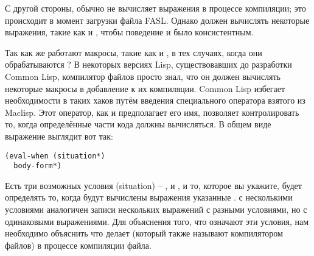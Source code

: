 С другой стороны,  обычно не вычисляет выражения в процессе компиляции;
это происходит в момент загрузки файла FASL. Однако  должен вычислять
некоторые выражения, такие как  и , чтобы поведение
 и  было консистентным.

Так как же работают макросы, такие как  и , в тех случаях,
когда они обрабатываются ?  В некоторых версиях Lisp, существовавших до
разработки Common Lisp, компилятор файлов просто знал, что он должен вычислять некоторые
макросы в добавление к их компиляции.  Common Lisp избегает необходимости в таких хаков
путём введения специального оператора  взятого из Maclisp.  Этот оператор,
как и предполагает его имя, позволяет контролировать то, когда определённые части кода
должны вычисляться. В общем виде выражение  выглядит вот так:

\begin{lstlisting}
(eval-when (situation*)
  body-form*)
\end{lstlisting}

Есть три возможных условия (situation) -- , 
и , и то, которое вы укажите, будет определять то, когда будут вычислены
выражения указанные .   с несколькими условиями
аналогичен записи нескольких выражений  с разными условиями, но с
одинаковыми выражениями.  Для объяснения того, что означают эти условия, нам необходимо
объяснить что делает  (который также называют компилятором файлов) в
процессе компиляции файла.

